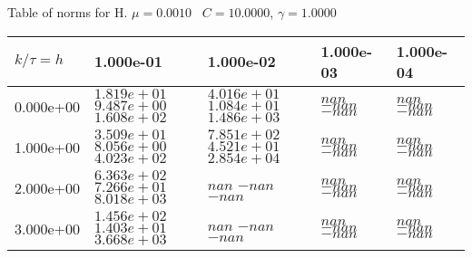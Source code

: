 \begin{center}
Table of norms for H. $\mu = 0.0010$ \, $C = 10.0000$, $\gamma = 1.0000$
  
\begin{tabular}{|p{1in}|p{1in}|p{1in}|p{1in}|p{1in}|} \hline
$k / \tau = h$ &1.000e-01 &1.000e-02 &1.000e-03 &1.000e-04 \\ \hline 
0.000e+00 & $1.819e+01$  $9.487e+00$  $1.608e+02$  & $4.016e+01$  $1.084e+01$  $1.486e+03$  & $nan$  $-nan$  $-nan$  & $nan$  $-nan$  $-nan$  \\ \hline 
1.000e+00 & $3.509e+01$  $8.056e+00$  $4.023e+02$  & $7.851e+02$  $4.521e+01$  $2.854e+04$  & $nan$  $-nan$  $-nan$  & $nan$  $-nan$  $-nan$  \\ \hline 
2.000e+00 & $6.363e+02$  $7.266e+01$  $8.018e+03$  & $nan$  $-nan$  $-nan$  & $nan$  $-nan$  $-nan$  & $nan$  $-nan$  $-nan$  \\ \hline 
3.000e+00 & $1.456e+02$  $1.403e+01$  $3.668e+03$  & $nan$  $-nan$  $-nan$  & $nan$  $-nan$  $-nan$  & $nan$  $-nan$  $-nan$  \\ \hline 

\end{tabular}\\[20pt]
\end{center}
